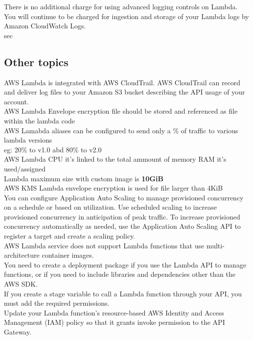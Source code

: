 \documentclass[12pt, letterpaper, twoside]{article}
\begin{document}
There is no additional charge for using advanced logging controls on Lambda. You will continue to be charged for 
ingestion and storage of your Lambda logs by Amazon CloudWatch Logs.\\sec

\subsection{Other topics}
AWS Lambda is integrated with AWS CloudTrail. AWS CloudTrail can record and deliver log files to your Amazon S3 
bucket describing the API usage of your account.\\	

AWS Lambda Envelope encryption file should be stored and referenced as file within
the lambda code\\

AWS Lamabda aliases can be configured to send only a \% of traffic to various lambda versions\\
eg: 20\% to v1.0 abd 80\% to v2.0\\

AWS Lambda CPU it's linked to the total ammount of memory RAM it's used/assigned\\

Lambda maximum size with custom image is \textbf{10GiB}\\

AWS KMS Lambda envelope encryption is used for file larger than 4KiB\\

You can configure Application Auto Scaling to manage provisioned concurrency on a schedule or based on utilization. 
Use scheduled scaling to increase provisioned concurrency in anticipation of peak traffic. To increase provisioned concurrency 
automatically as needed, use the Application Auto Scaling API to register a target and create a scaling policy.\\

AWS Lambda service does not support Lambda functions that use multi-architecture container images.\\

You need to create a deployment package if you use the Lambda API to manage functions, or if you need to include libraries 
and dependencies other than the AWS SDK.\\

If you create a stage variable to call a Lambda function through your API, you must add the required permissions.\\ 
Update your Lambda function's resource-based AWS Identity and Access Management (IAM) policy so that it grants invoke permission 
to the API Gateway.\\
\end{document}
